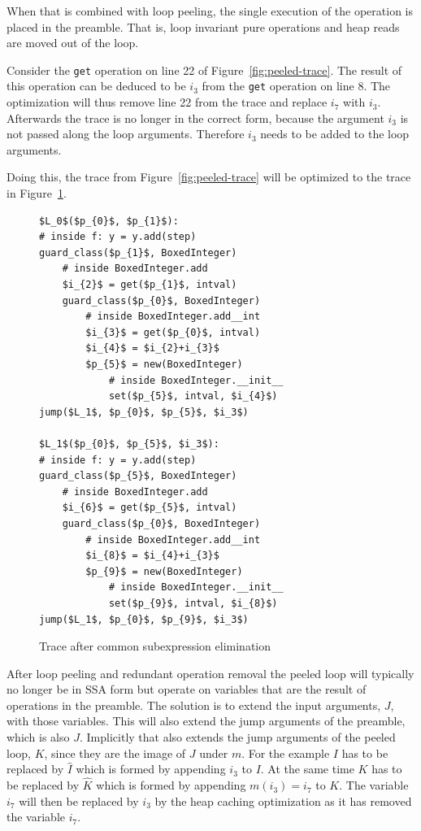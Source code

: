 \documentclass[preprint]{sigplanconf}
\begin{document}
When that is combined with loop peeling, the single execution of the operation
is placed in the preamble. That is, loop invariant pure operations and heap
reads are moved out of the loop. 

Consider the \lstinline{get} operation on line 22 of
Figure~\ref{fig:peeled-trace}. The result of this operation can be
deduced to be $i_3$ from the \lstinline{get} operation on line
8. The optimization will thus remove line 22 from the trace and
replace $i_7$ with $i_3$. Afterwards the trace is no longer in the correct
form, because the argument $i_3$ is not passed along the loop arguments.
Therefore $i_3$ needs to be added to the loop arguments.

Doing this, the trace from Figure~\ref{fig:peeled-trace} will be optimized to
the trace in Figure~\ref{fig:cse-trace}.

\begin{figure}
\begin{lstlisting}[mathescape,numbers = right,basicstyle=\setstretch{1.05}\ttfamily\scriptsize]
$L_0$($p_{0}$, $p_{1}$):
# inside f: y = y.add(step)
guard_class($p_{1}$, BoxedInteger)
    # inside BoxedInteger.add
    $i_{2}$ = get($p_{1}$, intval)
    guard_class($p_{0}$, BoxedInteger)
        # inside BoxedInteger.add__int
        $i_{3}$ = get($p_{0}$, intval)
        $i_{4}$ = $i_{2}+i_{3}$
        $p_{5}$ = new(BoxedInteger)
            # inside BoxedInteger.__init__
            set($p_{5}$, intval, $i_{4}$)
jump($L_1$, $p_{0}$, $p_{5}$, $i_3$)

$L_1$($p_{0}$, $p_{5}$, $i_3$):
# inside f: y = y.add(step)
guard_class($p_{5}$, BoxedInteger)
    # inside BoxedInteger.add
    $i_{6}$ = get($p_{5}$, intval)
    guard_class($p_{0}$, BoxedInteger)
        # inside BoxedInteger.add__int
        $i_{8}$ = $i_{4}+i_{3}$
        $p_{9}$ = new(BoxedInteger)
            # inside BoxedInteger.__init__
            set($p_{9}$, intval, $i_{8}$)
jump($L_1$, $p_{0}$, $p_{9}$, $i_3$)
\end{lstlisting}
\caption{Trace after common subexpression elimination}
\label{fig:cse-trace}
\end{figure}

After loop peeling and redundant operation removal the peeled loop
will typically no longer be in SSA form but operate on variables that are the result
of operations in the preamble. The solution is to extend the input
arguments, $J$, with those variables. This will also extend the
jump arguments of the preamble, which is also $J$. 
Implicitly that also extends the jump arguments of the peeled loop, $K$,
since they are the image of $J$ under $m$. For the example $I$ has to
be replaced by $\hat I$ which is formed by appending $i_3$ to $I$.
At the same time $K$ has to be replaced by
$\hat K$ which is formed by appending $m\left(i_3\right)=i_7$ to $K$.
The variable $i_7$ will then be replaced by $i_3$ by the heap caching
optimization as it has removed the variable $i_7$.
\end{document}
